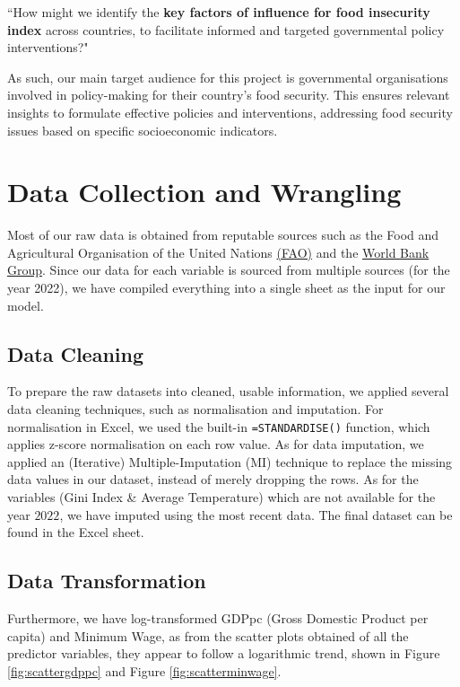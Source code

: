 \documentclass{article}
\begin{document}
\begin{formal}
    ``How might we identify the \textbf{key factors of influence for food insecurity index} across countries, to facilitate informed and targeted governmental policy interventions?"
\end{formal}

\noindent As such, our main target audience for this project is governmental organisations involved in policy-making for their country's food security. This ensures relevant insights to formulate effective policies and interventions, addressing food security issues based on specific socioeconomic indicators.

\section{Data Collection and Wrangling}
Most of our raw data is obtained from reputable sources such as the Food and Agricultural Organisation of the United Nations \href{https://www.fao.org/home/en}{(FAO)} and the \href{https://data.worldbank.org}{World Bank Group}. Since our data for each variable is sourced from multiple sources (for the year 2022), we have compiled everything into a single sheet as the input for our model. 

\subsection{Data Cleaning}\label{NormalisationImputation}
To prepare the raw datasets into cleaned, usable information, we applied several data cleaning techniques, such as normalisation and imputation. For normalisation in Excel, we used the built-in \verb|=STANDARDISE()| function, which applies z-score normalisation on each row value. As for data imputation, we applied an (Iterative) Multiple-Imputation (MI) technique \cite{MeanImputation} \cite{scikit-learn} to replace the missing data values in our dataset, instead of merely dropping the rows. As for the variables (Gini Index \& Average Temperature) which are not available for the year $2022$, we have imputed using the most recent data. The final dataset can be found in the Excel sheet.

\subsection{Data Transformation}
Furthermore, we have log-transformed GDPpc (Gross Domestic Product per capita) and Minimum Wage, as from the scatter plots obtained of all the predictor variables, they appear to follow a logarithmic trend, shown in Figure \ref{fig:scattergdppc} and Figure \ref{fig:scatterminwage}.
\end{document}
